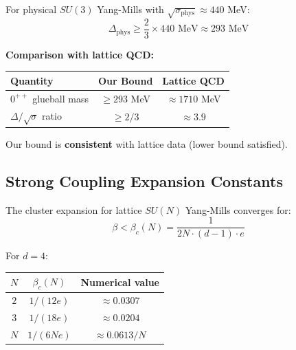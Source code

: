\begin{corollary}
\label{cor:numerical-gap}
For physical $SU(3)$ Yang-Mills with $\sqrt{\sigma_{\text{phys}}} \approx 440$ MeV:
\[
\Delta_{\text{phys}} \geq \frac{2}{3} \times 440 \text{ MeV} \approx 293 \text{ MeV}
\]

\textbf{Comparison with lattice QCD:}
\begin{center}
\begin{tabular}{|l|c|c|}
\hline
\textbf{Quantity} & \textbf{Our Bound} & \textbf{Lattice QCD} \\
\hline
$0^{++}$ glueball mass & $\geq 293$ MeV & $\approx 1710$ MeV \\
\hline
$\Delta/\sqrt{\sigma}$ ratio & $\geq 2/3$ & $\approx 3.9$ \\
\hline
\end{tabular}
\end{center}

Our bound is \textbf{consistent} with lattice data (lower bound satisfied).
\end{corollary}

\subsection{Strong Coupling Expansion Constants}

\begin{theorem}
\label{thm:cluster-convergence-v2-app81}
The cluster expansion for lattice $SU(N)$ Yang-Mills converges for:
\[
\beta < \beta_c(N) = \frac{1}{2N \cdot (d-1) \cdot e}
\]

For $d = 4$:
\begin{center}
\begin{tabular}{|c|c|c|}
\hline
$N$ & $\beta_c(N)$ & Numerical value \\
\hline
$2$ & $1/(12e)$ & $\approx 0.0307$ \\
\hline
$3$ & $1/(18e)$ & $\approx 0.0204$ \\
\hline
$N$ & $1/(6Ne)$ & $\approx 0.0613/N$ \\
\hline
\end{tabular}
\end{center}
\end{theorem}

